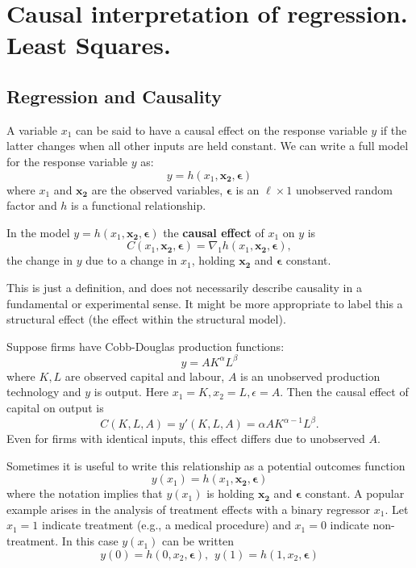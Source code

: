 \documentclass[DIV=14,titlepage=false]{scrreprt}
\begin{document}
\vspace{-10pt}
\setcounter{chapter}{1}
\chapter{Causal interpretation of regression. Least Squares.}
\vspace{-10pt}
\section{Regression and Causality}
A variable $x_1$ can be said to have a causal effect on the response variable $y$ if the latter changes when all other inputs are held constant. We can write a full model for the response variable $y$ as: \[ y = h(x_1, \mathbf{x_2},\boldsymbol{\epsilon}) \] where $x_1$ and $\mathbf{x_2}$ are the observed variables, $\boldsymbol{\epsilon}$ is an $\ell \times 1$ unobserved random factor and $h$ is a functional relationship. 

\begin{definition}\label{def:causaleffect}
In the model $y = h(x_1, \mathbf{x_2},\boldsymbol{\epsilon})$ the \textbf{causal effect} of $x_1$ on $y$ is  \[C(x_1, \mathbf{x_2},\boldsymbol{\epsilon})=\nabla_{1}h(x_1, \mathbf{x_2},\boldsymbol{\epsilon}), \] the change in $y$ due to a change in $x_1$, holding $\mathbf{x_2}$ and $\boldsymbol{\epsilon}$ constant.
\end{definition}

\begin{note}
This is just a definition, and does not necessarily describe causality in a fundamental or experimental sense. It might be more appropriate to label this a structural effect (the effect within the structural model).
\end{note}

\begin{example}
    Suppose firms have Cobb-Douglas production functions: \[y = AK^{\alpha}L^{\beta}\] where $ K,L$ are observed capital and labour, $A$ is an unobserved production technology and $y$ is output. Here $x_1=K, x_2=L, \epsilon=A$. Then the causal effect of capital on output is 
    \[C(K,L,A)= y'(K,L,A) = \alpha AK^{\alpha -1}L^{\beta}.\] Even for firms with identical inputs, this effect differs due to unobserved $A$.
\end{example}

Sometimes it is useful to write this relationship as a potential outcomes function \[y(x_1) = h(x_1, \mathbf{x_2},\boldsymbol{\epsilon}) \] where the notation implies that $y(x_1)$ is holding $\mathbf{x_2}$ and $\boldsymbol{\epsilon}$ constant. A popular example arises in the analysis of treatment effects with a binary regressor \( x_1 \). Let \( x_1 = 1 \) indicate treatment (e.g., a medical procedure) and \( x_1 = 0 \) indicate non-treatment. In this case \( y(x_1) \) can be written
\[
y(0) = h(0, x_2, \boldsymbol{\epsilon}), \hspace{5pt}
y(1) = h(1, x_2, \boldsymbol{\epsilon})
\]
\end{document}
